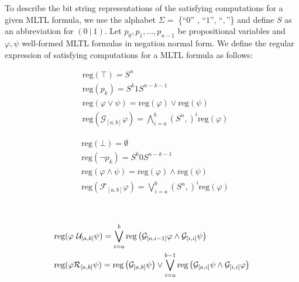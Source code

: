 \documentclass[runningheads]{llncs}
\renewcommand{\phi}{\varphi}
\begin{document}
To describe the bit string representations of the satisfying computations for a given MLTL formula, we use the alphabet $\Sigma =$ \{``$0$'' , ``$1$'', ``$,$''\} and define $S$ as an abbreviation for $(0 \ | \ 1)$.
Let $p_0, p_1, ..., p_{n-1}$ be propositional variables and $\phi, \psi$ well-formed MLTL formulas in negation normal form. We define the regular expression of satisfying computations for a MLTL formula as follows:\\


\vspace{-7mm}
\hspace{-8.5mm}
\begin{minipage}{0.45 \textwidth}
    \begin{align}
    &\text{reg}(\top) = S^n\\
    &\text{reg}(p_k) = S^{k}1S^{n-k-1} \\
    &\text{reg}(\phi \lor \psi) =  \text{reg}(\phi) \lor \text{reg}(\psi)\\
    &\text{reg}(\mathcal{G}_{[a,b]} \phi) = \bigwedge_{i=a}^{b} (S^n,)^i \text{reg}(\phi)
    \end{align}
\end{minipage}
\begin{minipage}{0.55\textwidth}
    \begin{align}
    &\text{reg}(\bot) = \emptyset \\
    &\text{reg}(\neg p_k) = S^{k}0S^{n-k-1} \\
    &\text{reg}(\phi \land \psi) = \text{reg}(\phi) \land \text{reg}(\psi) \\
    &\text{reg}(\mathcal{F}_{[a,b]} \phi) = \bigvee_{i=a}^{b} (S^n,)^i \text{reg}(\phi)
    \end{align}
\end{minipage}
\vspace{-5mm}\\
\begin{minipage}{0.99\textwidth}
\begin{align}
&\text{reg}(\phi \ \mathcal{U}_{[a,b]} \psi) =  \bigvee_{i=a}^{b} \text{reg}\left(\mathcal{G}_{[a,i-1]}\phi \land \mathcal{G}_{[i, i]} \psi\right)\\
\vspace*{-10mm}&\text{reg}(\phi \mathcal{R}_{[a,b]} \psi) =  \text{reg}\left(\mathcal{G}_{[a,b]}\psi\right) \lor \bigvee_{i=a}^{b-1} \text{reg}\left(\mathcal{G}_{[a,i]}\psi \land \mathcal{G}_{[i, i]} \phi\right) \label{release}
\end{align}
\end{minipage}
\end{document}
